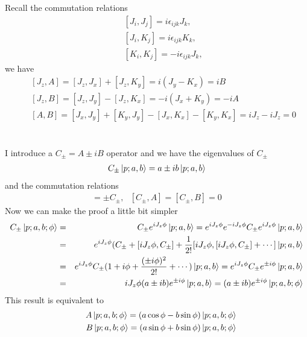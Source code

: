 \documentclass[11pt]{article}
\begin{document}
\section{ }
Recall the commutation relations
\begin{eqnarray}
  &&[ J_i, J_j ] =  i \epsilon_{ijk} J_k, \\
  &&[ J_i, K_j ] =  i \epsilon_{ijk} K_k, \\
  &&[ K_i, K_j ] = -i \epsilon_{ijk} J_k, 
\end{eqnarray}
we have
\begin{eqnarray}
  &&[J_z,A]=[J_z, J_x]+[J_z,K_y]=i (J_y-K_x)=iB\\
  &&[J_z,B]=[J_z, J_y]-[J_z,K_x]=-i (J_x+K_y)=-iA \\
  &&[A,B]=[J_x,J_y]+[K_y,J_y]-[J_x,K_x]-[K_y,K_x]=iJ_z-iJ_z=0
\end{eqnarray}

\section{ }
I introduce a $C_\pm =A\pm iB$ operator and we have the eigenvalues of $C_\pm$
\begin{eqnarray}
  C_\pm \ket{p;a,b} = a\pm ib \ket{p;a,b}
\end{eqnarray}
and the commutation relations
\begin{eqnarray}
  [ J_z ,C_\pm ] = \pm C_\pm,~~~[ C_\pm , A ]=[ C_\pm , B ] = 0 
\end{eqnarray}
Now we can make the proof a little bit simpler
\begin{eqnarray}
  C_\pm \ket{p;a,b;\phi} &=& C_\pm e^{iJ_z\phi} \ket{p;a,b}= e^{iJ_z\phi}e^{-iJ_z\phi}C_\pm e^{iJ_z\phi} \ket{p;a,b}\\
  &=& e^{iJ_z\phi} (C_\pm+[iJ_z\phi,C_\pm]+\frac{1}{2!}[iJ_z\phi,[iJ_z\phi,C_\pm]+\cdots]\ket{p;a,b}\\
  &=& e^{iJ_z\phi} C_\pm (1+i\phi+\frac{(\pm i\phi)^2}{2!}+\cdots) \ket{p;a,b}=e^{iJ_z\phi} C_\pm e^{\pm i\phi} \ket{p;a,b}\\
  &=&{iJ_z\phi} (a\pm ib)e^{\pm i\phi}\ket{p;a,b} = (a\pm ib)e^{\pm i\phi} \ket{p;a,b;\phi}
\end{eqnarray}
This result is equivalent to
\begin{eqnarray}
  && A \ket{p;a,b;\phi} = (a \cos\phi - b \sin\phi) \ket{p;a,b;\phi} \\
  && B \ket{p;a,b;\phi} = (a \sin\phi + b \sin\phi) \ket{p;a,b;\phi} 
\end{eqnarray}
\end{document}
